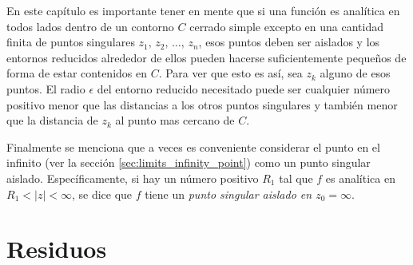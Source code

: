 \documentclass[a4paper]{report}
\begin{document}
En este capítulo es importante tener en mente que si una función es analítica en todos lados dentro de un contorno \(C\) cerrado simple excepto en una cantidad finita de puntos singulares \(z_1,\,z_2,\,\dots,\,z_n\), esos puntos deben ser aislados y los entornos reducidos alrededor de ellos pueden hacerse suficientemente pequeños de forma de estar contenidos en \(C\). Para ver que esto es así, sea \(z_k\) alguno de esos puntos. El radio \(\epsilon\) del entorno reducido necesitado puede ser cualquier número positivo menor que las distancias a los otros puntos singulares y también menor que la distancia de \(z_k\) al punto mas cercano de \(C\). 

Finalmente se menciona que a veces es conveniente considerar el punto en el infinito (ver la sección \ref{sec:limits_infinity_point}) como un punto singular aislado. Específicamente, si hay un número positivo \(R_1\) tal que \(f\) es analítica en \(R_1<|z|<\infty\), se dice que \(f\) tiene un \emph{punto singular aislado en \(z_0=\infty\)}.

\section{Residuos}\label{sec:residues}
\end{document}
